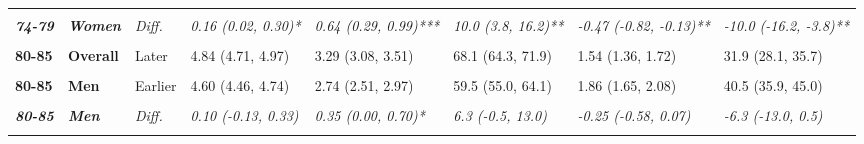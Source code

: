 \begin{table}[!h]
{{\begin{tabular}[t]{>{}l>{}lllllll}
\textbf{\cellcolor{gray!10}{74-79}} & \textbf{\cellcolor{gray!10}{Women}} & \cellcolor{gray!10}{Later} & \cellcolor{gray!10}{5.52 (5.43, 5.62)} & \cellcolor{gray!10}{3.48 (3.21, 3.75)} & \cellcolor{gray!10}{63.0 (58.2, 67.8)} & \cellcolor{gray!10}{2.04 (1.77, 2.31)} & \cellcolor{gray!10}{37.0 (32.2, 41.8)}\\
\cmidrule{1-8}
\em{\textbf{74-79}} & \em{\textbf{Women}} & \em{Diff.} & \em{0.16 (0.02, 0.30)*} & \em{0.64 (0.29, 0.99)***} & \em{10.0 (3.8, 16.2)**} & \em{-0.47 (-0.82, -0.13)**} & \em{-10.0 (-16.2, -3.8)**}\\
\cmidrule{1-8}
\textbf{\cellcolor{gray!10}{80-85}} & \textbf{\cellcolor{gray!10}{Overall}} & \cellcolor{gray!10}{Earlier} & \cellcolor{gray!10}{4.74 (4.63, 4.85)} & \cellcolor{gray!10}{2.75 (2.58, 2.92)} & \cellcolor{gray!10}{58.0 (54.8, 61.2)} & \cellcolor{gray!10}{1.99 (1.83, 2.15)} & \cellcolor{gray!10}{42.0 (38.8, 45.2)}\\
\cmidrule{1-8}
\textbf{80-85} & \textbf{Overall} & Later & 4.84 (4.71, 4.97) & 3.29 (3.08, 3.51) & 68.1 (64.3, 71.9) & 1.54 (1.36, 1.72) & 31.9 (28.1, 35.7)\\
\cmidrule{1-8}
\em{\textbf{\cellcolor{gray!10}{80-85}}} & \em{\textbf{\cellcolor{gray!10}{Overall}}} & \em{\cellcolor{gray!10}{Diff.}} & \em{\cellcolor{gray!10}{0.10 (-0.07, 0.27)}} & \em{\cellcolor{gray!10}{0.55 (0.27, 0.82)***}} & \em{\cellcolor{gray!10}{10.1 (5.1, 15.1)***}} & \em{\cellcolor{gray!10}{-0.45 (-0.69, -0.21)***}} & \em{\cellcolor{gray!10}{-10.1 (-15.1, -5.1)***}}\\
\cmidrule{1-8}
\textbf{80-85} & \textbf{Men} & Earlier & 4.60 (4.46, 4.74) & 2.74 (2.51, 2.97) & 59.5 (55.0, 64.1) & 1.86 (1.65, 2.08) & 40.5 (35.9, 45.0)\\
\cmidrule{1-8}
\textbf{\cellcolor{gray!10}{80-85}} & \textbf{\cellcolor{gray!10}{Men}} & \cellcolor{gray!10}{Later} & \cellcolor{gray!10}{4.70 (4.52, 4.88)} & \cellcolor{gray!10}{3.09 (2.82, 3.36)} & \cellcolor{gray!10}{65.8 (60.8, 70.8)} & \cellcolor{gray!10}{1.61 (1.36, 1.85)} & \cellcolor{gray!10}{34.2 (29.2, 39.2)}\\
\cmidrule{1-8}
\em{\textbf{80-85}} & \em{\textbf{Men}} & \em{Diff.} & \em{0.10 (-0.13, 0.33)} & \em{0.35 (0.00, 0.70)*} & \em{6.3 (-0.5, 13.0)} & \em{-0.25 (-0.58, 0.07)} & \em{-6.3 (-13.0, 0.5)}\\
\cmidrule{1-8}
\textbf{\cellcolor{gray!10}{80-85}} & \textbf{\cellcolor{gray!10}{Women}} & \cellcolor{gray!10}{Earlier} & \cellcolor{gray!10}{4.85 (4.71, 5.00)} & \cellcolor{gray!10}{2.76 (2.54, 2.98)} & \cellcolor{gray!10}{56.9 (52.7, 61.0)} & \cellcolor{gray!10}{2.09 (1.88, 2.30)} & \cellcolor{gray!10}{43.1 (39.0, 47.3)}\\

\end{tabular}}}
\end{table}
